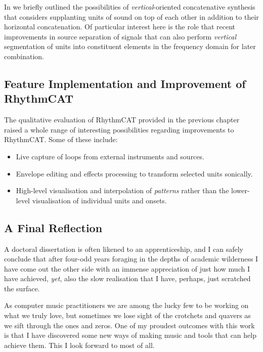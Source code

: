 In  we briefly outlined the possibilities of \textit{vertical}-oriented concatenative synthesis that considers supplanting units of sound on top of each other in addition to their horizontal concatenation. Of particular interest here is the role that recent improvements in source separation of signals that can also perform \textit{vertical} segmentation of units into constituent elements in the frequency domain for later combination.

\subsection{Feature Implementation and Improvement of RhythmCAT}

The qualitative evaluation of RhythmCAT provided in the previous chapter raised a whole range of interesting possibilities regarding improvements to RhythmCAT. Some of these include:

\begin{itemize}
  \item Live capture of loops from external instruments and sources.
  \item Envelope editing and effects processing to transform selected units sonically.
  \item High-level visualisation and interpolation of \textit{patterns} rather than the lower-level visualisation of individual units and onsets.
\end{itemize}

\subsection{A Final Reflection} 

A doctoral dissertation is often likened to an apprenticeship, and I can safely conclude that after four-odd years foraging in the depths of academic wilderness I have come out the other side with an immense  appreciation of just how much I have achieved, \textit{yet}, also the slow realisation that I have, perhaps, just scratched the surface.

As computer music practitioners we are among the lucky few to be working on what we truly love, but sometimes we lose sight of the crotchets and quavers as we sift through the ones and zeros. One of my proudest outcomes with this work is that I have discovered some new ways of making music and tools that can help achieve them. This I look forward to most of all.







